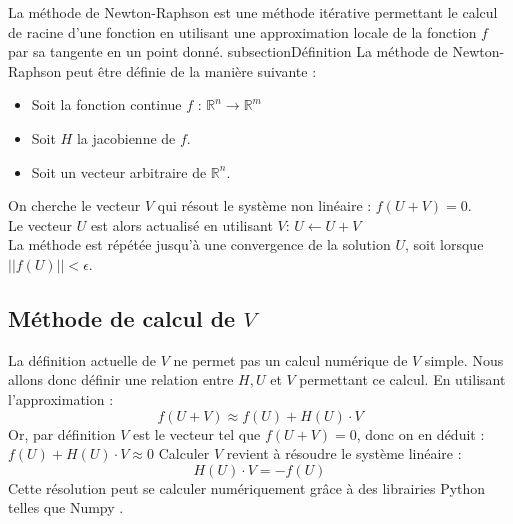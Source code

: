 La méthode de Newton-Raphson est une méthode itérative permettant le calcul de racine d'une fonction en utilisant 
une approximation locale de la fonction $f$ par sa tangente en un point donné.
subsection{Définition}
La méthode de Newton-Raphson peut être définie de la manière suivante : \\
\begin{itemize}
  \item Soit la fonction continue  $f$ : $ \mathbb{R}^n \to \mathbb{R}^m $
  \item Soit $ H $ la jacobienne de $f$.
  \item Soit un vecteur arbitraire de $\mathbb{R}^n$.
\end{itemize}
On cherche le vecteur $V$ qui résout le système non linéaire : $f(U + V) = 0$.\\
Le vecteur $U$ est alors actualisé en utilisant $V$: $U \gets U + V$ \\
La méthode est répétée jusqu'à une convergence de la solution $U$, soit lorsque $||f(U)|| < \epsilon$.



\subsection{Méthode de calcul de $V$}
La définition actuelle de $V$ ne permet pas un calcul numérique de $V$ simple.
Nous allons donc définir une relation entre $H, U$ et $ V$ permettant ce calcul.
En utilisant l'approximation :
\[
f(U + V) \approx f(U) + H(U)\cdot V
\]
Or, par définition $V$ est le vecteur tel que $f(U + V ) = 0$, donc on en déduit : $f(U) + H(U)\cdot V \approx 0 $
Calculer $V$ revient à résoudre le système linéaire :
\[
H(U)\cdot V = -f(U)
\]
Cette résolution peut se calculer numériquement grâce à des librairies Python telles que Numpy \citep{numpy_equalin}.


